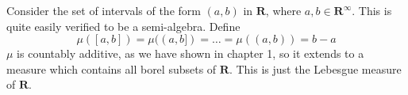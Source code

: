 \begin{example}
    Consider the set of intervals of the form $(a,b)$ in $\mathbf{R}$, where $a,b \in \mathbf{R}^\infty$. This is quite easily verified to be a semi-algebra. Define
    \[ \mu([a,b]) = \mu((a,b]) = \dots = \mu((a,b)) = b - a \]
    $\mu$ is countably additive, as we have shown in chapter 1, so it extends to a measure which contains all borel subsets of $\mathbf{R}$. This is just the Lebesgue measure of $\mathbf{R}$.
\end{example}

